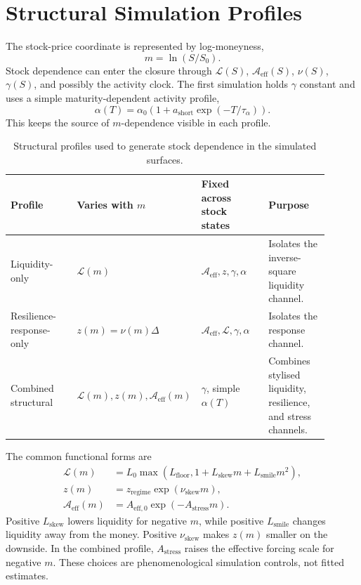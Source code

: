 \documentclass[11pt]{article}
\newcommand{\Aeff}{\mathcal A_{\mathrm{eff}}}
\newcommand{\Liq}{\mathcal L}
\begin{document}
\section{Structural Simulation Profiles}

The stock-price coordinate is represented by log-moneyness,
\begin{equation}
 m=\ln(S/S_0).
\end{equation}
Stock dependence can enter the closure through \(\Liq(S)\), \(\Aeff(S)\),
\(\nu(S)\), \(\gamma(S)\), and possibly the activity clock. The first
simulation holds \(\gamma\) constant and uses a simple maturity-dependent
activity profile,
\begin{equation}
 \alpha(T)
 =
 \alpha_0\left(1+a_{\mathrm{short}}\exp(-T/\tau_\alpha)\right).
 \label{eq:activity-profile}
\end{equation}
This keeps the source of \(m\)-dependence visible in each profile.

\begin{table}[ht]
\centering
\small
\caption{Structural profiles used to generate stock dependence in the simulated surfaces.}
\label{tab:profile-definitions}
\begin{tabular}{p{0.22\linewidth}p{0.26\linewidth}p{0.22\linewidth}p{0.20\linewidth}}
\toprule
Profile & Varies with \(m\) & Fixed across stock states & Purpose \\
\midrule
Liquidity-only & \(\Liq(m)\) &
\(\Aeff,z,\gamma,\alpha\) &
Isolates the inverse-square liquidity channel. \\
Resilience-response-only & \(z(m)=\nu(m)\Delta\) &
\(\Aeff,\Liq,\gamma,\alpha\) &
Isolates the response channel. \\
Combined structural & \(\Liq(m),z(m),\Aeff(m)\) &
\(\gamma\), simple \(\alpha(T)\) &
Combines stylised liquidity, resilience, and stress channels. \\
\bottomrule
\end{tabular}
\end{table}

The common functional forms are
\begin{align}
 \Liq(m)
 &=
 L_0\max\!\left(L_{\mathrm{floor}},
 1+L_{\mathrm{skew}}m+L_{\mathrm{smile}}m^2\right),
 \label{eq:liquidity-profile}\\
 z(m)
 &=
 z_{\mathrm{regime}}\exp(\nu_{\mathrm{skew}}m),
 \label{eq:z-profile}\\
 \Aeff(m)
 &=
 A_{\mathrm{eff},0}\exp(-A_{\mathrm{stress}}m).
 \label{eq:forcing-profile}
\end{align}
Positive \(L_{\mathrm{skew}}\) lowers liquidity for negative \(m\), while
positive \(L_{\mathrm{smile}}\) changes liquidity away from the money.
Positive \(\nu_{\mathrm{skew}}\) makes \(z(m)\) smaller on the downside.
In the combined profile, \(A_{\mathrm{stress}}\) raises the effective forcing
scale for negative \(m\). These choices are phenomenological simulation
controls, not fitted estimates.
\end{document}
